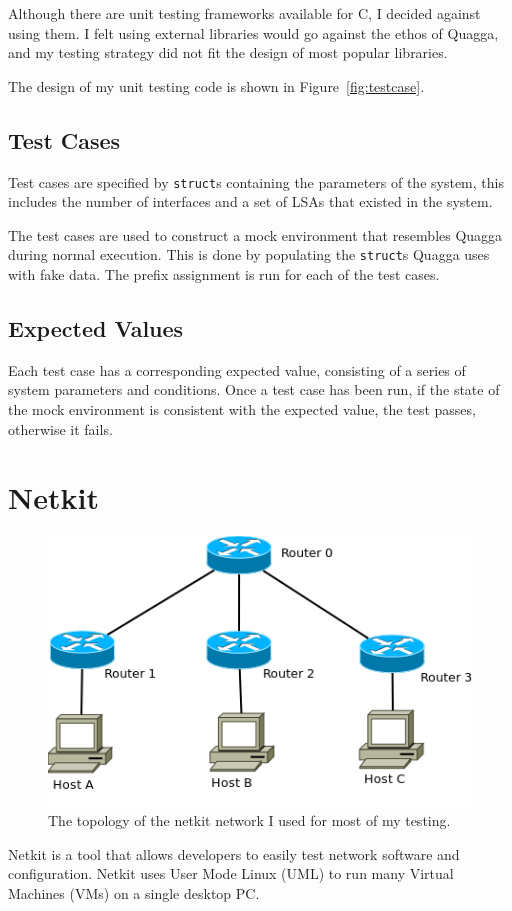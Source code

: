 \documentclass[12pt,a4paper,twoside]{report}
\begin{document}
Although there are unit testing frameworks available for C, I decided against
using them.  I felt using external libraries  would go against the ethos of
Quagga, and my testing strategy did not fit the design of most popular
libraries. 

The design of my unit testing code is shown in Figure~\ref{fig:testcase}.

\subsection{Test Cases}
Test cases are specified by \texttt{struct}s containing the parameters of
the system, this includes the number of interfaces and a set of LSAs that
existed in the system. 

The test cases are used to construct a mock environment that resembles
Quagga during normal execution. This is done by populating the \texttt{struct}s
Quagga uses with fake data. The prefix assignment is run for each of the test
cases. 

\subsection{Expected Values}
Each test case has a corresponding expected value, consisting of a
series of system parameters and conditions. Once a test case has been run, if
the state of the mock environment is consistent with the expected value, the
test passes, otherwise it fails. 

\section{Netkit} 
\begin{figure}
\begin{center}
	\includegraphics[width=\linewidth]{../Diagrams/Network/MainNetkit.png}
	\caption{The topology of the netkit network I used for most of my testing.}
	\label{fig:NetkitTopology}
\end{center}
\end{figure}
Netkit is a tool that allows developers to easily test network software and
configuration. Netkit uses User Mode Linux (UML)  to run many Virtual Machines (VMs) 
on a single desktop PC. 
\end{document}
